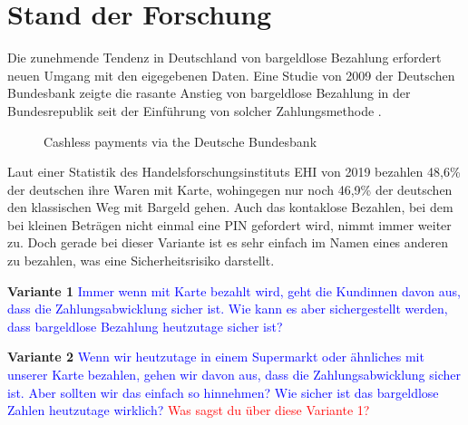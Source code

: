 \section{Stand der Forschung}


Die zunehmende Tendenz in Deutschland von bargeldlose Bezahlung erfordert neuen Umgang mit den 
eigegebenen Daten. Eine Studie von 2009 der Deutschen Bundesbank zeigte die rasante Anstieg von 
bargeldlose Bezahlung in der Bundesrepublik seit der Einführung von solcher Zahlungsmethode 
\cite{refrep:DBCP}.

\begin{figure}[htb]
    \caption{Cashless payments via the Deutsche Bundesbank}
    \label{fig:refrep_DB}
\end{figure}


Laut einer Statistik des Handelsforschungsinstituts EHI von 2019 \cite{refart:KSDL} bezahlen 48,6\% 
der deutschen ihre Waren mit Karte, wohingegen nur noch 46,9\% der deutschen den klassischen 
Weg mit Bargeld gehen. Auch das kontaklose Bezahlen, bei dem bei kleinen Beträgen nicht einmal eine
PIN gefordert wird, nimmt immer weiter zu. Doch gerade bei dieser Variante ist es sehr einfach
im Namen eines anderen zu bezahlen, was eine Sicherheitsrisiko darstellt.

\vspace{1cm}

\textbf{Variante 1}
\textcolor{blue}{Immer wenn mit Karte bezahlt wird, geht die Kundinnen davon aus, dass die
Zahlungsabwicklung sicher ist. Wie kann es aber sichergestellt werden, dass bargeldlose Bezahlung 
heutzutage sicher ist?}


\textbf{Variante 2}  
\textcolor{blue}{Wenn wir heutzutage in einem Supermarkt oder ähnliches mit unserer Karte bezahlen,
gehen wir davon aus, dass die Zahlungsabwicklung sicher ist. Aber sollten wir das einfach so hinnehmen?
Wie sicher ist das bargeldlose Zahlen heutzutage wirklich? \textcolor{red}{Was sagst du über diese
Variante 1?}}

